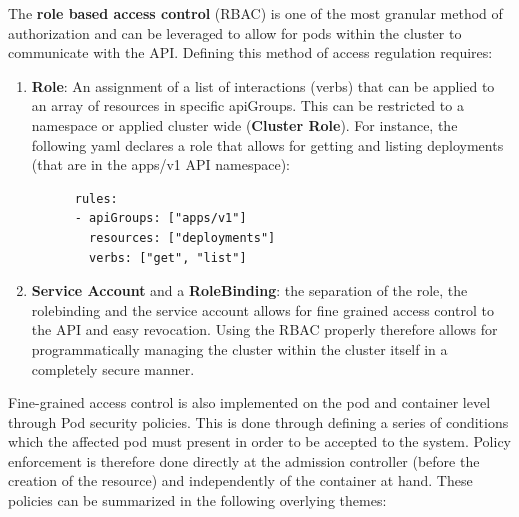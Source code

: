 \documentclass[11pt]{article}
\begin{document}
\vspace{5mm}
The \textbf{role based access control} (RBAC) is one of the most granular method of authorization and can be leveraged to allow for pods within the cluster to communicate with the API. Defining this method of access regulation requires: 

\begin{enumerate}
    \item \textbf{Role}: \newline An assignment of a list of interactions (verbs) that can be applied to an array of resources in specific apiGroups. This can be restricted to a namespace or applied cluster wide (\textbf{Cluster Role}). For instance, the following yaml declares a role that allows for getting and listing deployments (that are in the apps/v1 API namespace): 
      \begin{verbatim}
      rules:
      - apiGroups: ["apps/v1"]
        resources: ["deployments"]
        verbs: ["get", "list"]
      \end{verbatim}
      
     \item \textbf{Service Account} and a \textbf{RoleBinding}: the separation of the role, the rolebinding and the service account allows for fine grained access control to the API and easy revocation. Using the RBAC properly therefore allows for programmatically managing the cluster within the cluster itself in a completely secure manner.
\end{enumerate}


\hspace{5mm} Fine-grained access control is also implemented on the pod and container level through Pod security policies. This is done through defining a series of conditions which the affected pod must present in order to be accepted to the system. Policy enforcement is therefore done directly at the admission controller (before the creation of the resource) and independently of the container at hand. These policies can be summarized in the following overlying themes:
\end{document}

